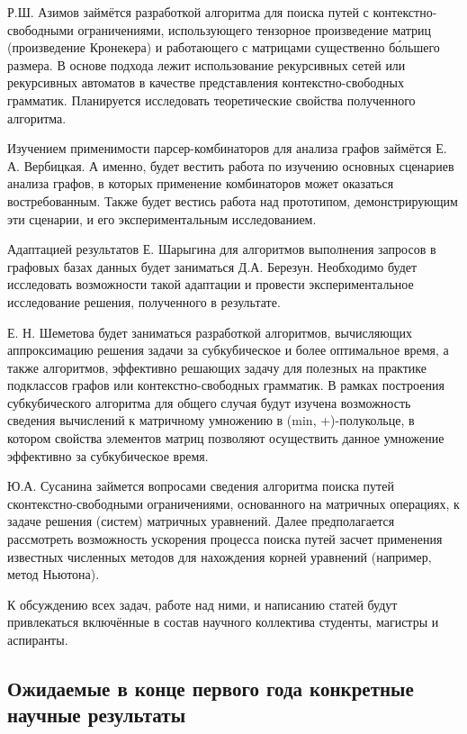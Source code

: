 \documentclass[12pt]{article}  %
\theoremstyle{remark}
\begin{document}
Р.Ш. Азимов займётся разработкой алгоритма для поиска путей с контекстно-свободными ограничениями, использующего тензорное произведение матриц (произведение Кронекера) и работающего с матрицами существенно б\'{о}льшего размера.
В основе подхода лежит использование рекурсивных сетей или рекурсивных автоматов в качестве представления контекстно-свободных грамматик.
Планируется исследовать теоретические свойства полученного алгоритма.

Изучением применимости парсер-комбинаторов для анализа графов займётся Е. А. Вербицкая.
А именно, будет вестить работа по изучению основных сценариев анализа графов, в которых применение комбинаторов может оказаться востребованным.
Также будет вестись работа над прототипом, демонстрирующим эти сценарии, и его экспериментальным исследованием.

Адаптацией результатов Е. Шарыгина для алгоритмов выполнения запросов в графовых базах данных будет заниматься Д.А. Березун.
Необходимо будет исследовать возможности такой адаптации и провести экспериментальное исследование решения, полученного в результате.

Е. Н. Шеметова будет заниматься разработкой алгоритмов, вычисляющих аппроксимацию решения задачи за субкубическое и более оптимальное время, а также алгоритмов, эффективно решающих задачу для полезных на практике подклассов графов или контекстно-свободных грамматик. В рамках построения субкубического алгоритма для общего случая будут изучена возможность сведения вычислений к матричному умножению в (min, +)-полукольце, в котором свойства элементов матриц позволяют осуществить данное умножение эффективно за субкубическое время.

Ю.А. Сусанина займется вопросами сведения алгоритма поиска путей сконтекстно-свободными ограничениями, основанного на матричных операциях, к задаче решения (систем) матричных уравнений.
Далее предполагается рассмотреть возможность ускорения процесса поиска путей засчет применения известных численных методов для нахождения корней уравнений (например, метод Ньютона).

К обсуждению всех задач, работе над ними, и написанию статей будут привлекаться включённые в состав научного коллектива студенты, магистры и аспиранты.

\subsection{Ожидаемые в конце первого года конкретные научные результаты}
\end{document}
